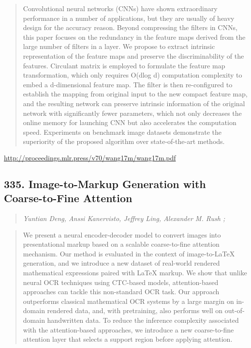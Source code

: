 \documentclass{article}
\begin{document}
\begin{quote}
    Convolutional neural networks (CNNs) have shown extraordinary performance in a number of applications, but they are usually of heavy design for the accuracy reason. Beyond compressing the filters in CNNs, this paper focuses on the redundancy in the feature maps derived from the large number of filters in a layer. We propose to extract intrinsic representation of the feature maps and preserve the discriminability of the features. Circulant matrix is employed to formulate the feature map transformation, which only requires O(dlog d) computation complexity to embed a d-dimensional feature map. The filter is then re-configured to establish the mapping from original input to the new compact feature map, and the resulting network can preserve intrinsic information of the original network with significantly fewer parameters, which not only decreases the online memory for launching CNN but also accelerates the computation speed. Experiments on benchmark image datasets demonstrate the superiority of the proposed algorithm over state-of-the-art methods.  \end{quote}

\href{http://proceedings.mlr.press/v70/wang17m/wang17m.pdf}{http://proceedings.mlr.press/v70/wang17m/wang17m.pdf}

\subsection{335. Image-to-Markup Generation with Coarse-to-Fine Attention}

\begin{quote}
\footnotesize{\textit{Yuntian Deng, Anssi Kanervisto, Jeffrey Ling, Alexander M. Rush ;}}
\end{quote}

\begin{quote}
    We present a neural encoder-decoder model to convert images into presentational markup based on a scalable coarse-to-fine attention mechanism. Our method is evaluated in the context of image-to-LaTeX generation, and we introduce a new dataset of real-world rendered mathematical expressions paired with LaTeX markup. We show that unlike neural OCR techniques using CTC-based models, attention-based approaches can tackle this non-standard OCR task. Our approach outperforms classical mathematical OCR systems by a large margin on in-domain rendered data, and, with pretraining, also performs well on out-of-domain handwritten data. To reduce the inference complexity associated with the attention-based approaches, we introduce a new coarse-to-fine attention layer that selects a support region before applying attention.  \end{quote}
\end{document}
